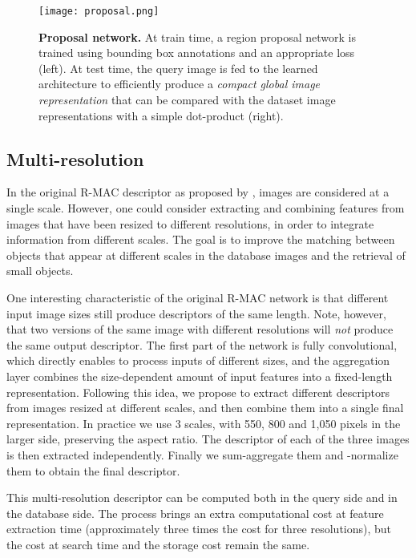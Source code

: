 \documentclass[twocolumn]{svjour3}          \smartqed  \usepackage{graphicx}
\begin{document}
\begin{figure*}[th!]
\texttt{[image: proposal.png]}
\caption{\textbf{Proposal network.} 
At train time, a region proposal network is trained using bounding box annotations and an appropriate loss (left). At test time, the query image is fed to the learned architecture to
efficiently produce a \textit{compact global image representation} that can be compared with the dataset image representations with a
simple dot-product (right). \label{fig:rpn}}
\end{figure*}

\subsection{Multi-resolution}
\label{sec:multi-res}



In the original R-MAC descriptor as proposed by \cite{Tolias2016}, images are considered at a single scale. However, one could consider extracting and combining features from images that have been resized to different resolutions, in order to integrate information from different scales. The goal is to improve the matching between objects that appear at different scales in the database images and the retrieval of small objects.

One interesting characteristic of the original R-MAC network is that different input image sizes still produce descriptors of the same length. Note, however, that two versions of the same image with different resolutions will \emph{not} produce the same output descriptor. The first part of the network is fully convolutional, which directly enables to process inputs of different sizes, and the aggregation layer combines the size-dependent amount of input features into a fixed-length representation. Following this idea, we propose to extract different descriptors from images resized at different scales, and then combine them into a single final representation. 
In practice we use 3 scales, with 550, 800 and 1,050 pixels in the larger side, preserving the aspect ratio. The descriptor of each of the three images is then extracted independently. Finally we sum-aggregate them and -normalize them to obtain the final descriptor.

This multi-resolution descriptor can be computed both in the query side and in the database side.
The process brings an extra computational cost at feature extraction time (approximately three times the cost for three resolutions), but the cost at search time and the storage cost remain the same.
\end{document}
